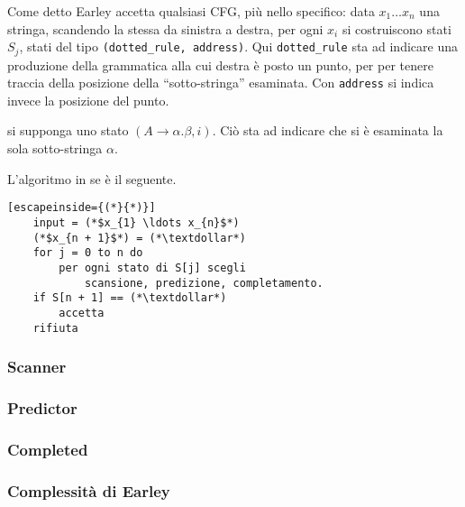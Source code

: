\documentclass{subfiles}
\begin{document}
Come detto Earley accetta qualsiasi CFG, più nello specifico: data \(x_{1} \ldots x_{n}\) una stringa,
scandendo la stessa da sinistra a destra, per ogni \(x_{i}\) si costruiscono stati \(S_{j}\), stati del tipo \lstinline{(dotted_rule, address)}.
Qui \lstinline{dotted_rule} sta ad indicare una produzione della grammatica alla cui destra è posto un punto,
per per tenere traccia della posizione della ``sotto-stringa'' esaminata. Con \lstinline{address} si indica invece la posizione del punto.

\begin{Example*}
    si supponga uno stato \((A \to \alpha . \beta, i)\). Ciò sta ad indicare che si è esaminata la sola sotto-stringa \(\alpha\).
\end{Example*}

\noindent L'algoritmo in se è il seguente.
\begin{lstlisting}[escapeinside={(*}{*)}]
    input = (*$x_{1} \ldots x_{n}$*)
    (*$x_{n + 1}$*) = (*\textdollar*)
    for j = 0 to n do
        per ogni stato di S[j] scegli
            scansione, predizione, completamento.
    if S[n + 1] == (*\textdollar*)
        accetta
    rifiuta
\end{lstlisting}

\subsubsection{Scanner}


\subsubsection{Predictor}


\subsubsection{Completed}


\subsubsection{Complessità di Earley}

\end{document}

